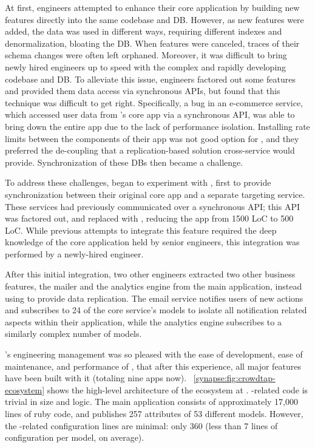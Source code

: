 At first, engineers attempted to enhance their core application by building new features directly into the same codebase and DB.
However, as new features were added, the data was used in different ways, requiring different indexes and denormalization, bloating the DB.
When features were canceled, traces of their schema changes were often left orphaned.
Moreover, it was difficult to bring newly hired engineers up to speed with the complex and rapidly developing codebase and DB.
To alleviate this issue, engineers factored out some features and provided them
data access via synchronous APIs, but found that this technique was difficult to
get right.
Specifically, a bug in an e-commerce service, which accessed user data from
\crowdtap's core app via a synchronous API, was able to bring down the entire app due to
the lack of performance isolation.  Installing rate limits between the components
of their app was not good option for \crowdtap, and they preferred the
de-coupling that a replication-based solution cross-service would provide.
Synchronization of these DBs then became a challenge.

To address these challenges, \crowdtap began to experiment with \synapse,
first to provide synchronization between their original core app and a separate
targeting service.  These services had previously communicated over a
synchronous API; this API was factored out, and replaced with \synapse,
reducing the app from 1500 LoC to 500 LoC.  While previous attempts to integrate
this feature required the deep knowledge of the core application held by senior
engineers, this integration was performed by a newly-hired engineer.

After this initial integration, two other \crowdtap engineers extracted two other business features, the mailer and the analytics engine from the main application, instead using \synapse to provide data replication.
The email service notifies users of new actions and subscribes to 24 of the core service's models to isolate all notification related aspects within their application, while the analytics engine subscribes to a similarly complex number of models.

\crowdtap's engineering management was so pleased with the ease of development, ease of maintenance, and performance of \synapse, that after this experience, all major features have been built with it (totaling nine apps now).
\F~\ref{synapse:fig:crowdtap-ecosystem} shows the high-level architecture of the \synapse ecosystem at \crowdtap.
\synapse-related code is trivial in size and logic.
The \crowdtap main application consists of approximately 17,000 lines of ruby code, and publishes 257 attributes of 53 different models.
However, the \synapse-related configuration lines are minimal: only 360 (less
than 7 lines of configuration per model, on average).

